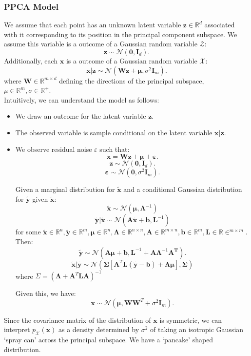 \subsubsection{PPCA Model}
We assume that each point has an unknown latent variable $\mathbf{z}\in
\mathbb{R}^{d}$ associated with it corresponding to its position in the
principal component subspace. We assume this variable is a outcome of a Gaussian random variable
$\mathcal{Z}$:
\[\mathbf{z}\sim\mathcal{N}\left( \mathbf{0},\mathbf{I}_d \right).\] 
Additionally, each $\mathbf{x}$ is a outcome of a Gaussian random variable $\mathcal{X}$:
\[\mathbf{x|z}\sim\mathcal{N}\left( \mathbf{Wz+\mu},\sigma^{2}\mathbf{I}_m \right).\]
where $\mathbf{W}\in \mathbb{R}^{m\times d}$ defining the directions of the
principal subspace, $\mu\in \mathbb{R}^{m},\sigma\in \mathbb{R}^{+}$.\\

Intuitively, we can understand the model as follows:
\begin{itemize}
  \item We draw an outcome for the latent variable $\mathbf{z}$.
  \item The observed variable is sample conditional on the latent variable $\mathbf{x}|\mathbf{z}$.
  \item We observe residual noise $\varepsilon$ such that:
    \[\mathbf{x}=\mathbf{Wz+\mu+\varepsilon}.\] 
    \[\mathbf{z}\sim\mathcal{N}\left( \mathbf{0},\mathbf{I}_d \right).\] 
    \[\mathbf{\varepsilon}\sim\mathcal{N}\left( \mathbf{0},\sigma^{2}\mathbf{I}_m \right).\] 
    \begin{remark}
      Given a marginal distribution for $\mathbf{\tilde{x}}$ and a conditional
      Gaussian distribution for $\mathbf{\tilde{y}}$ given
      $\mathbf{\tilde{x}}$:
      \[\mathbf{\tilde{x}}\sim\mathcal{N}(\mathbf{\mu},\mathbf{\Lambda}^{-1})\] 
      \[\mathbf{\tilde{y}|\tilde{x}}\sim\mathcal{N}(\mathbf{A\tilde{x}+b},\mathbf{L}^{-1})\] 
      for some $\mathbf{\tilde{x}}\in \mathbb{R}^{n},\mathbf{\tilde{y}}\in \mathbb{R}^{m},\mathbf{\mu}\in \mathbb{R}^{n},\mathbf{\Lambda}\in \mathbb{R}^{n\times n},\mathbf{A}\in \mathbb{R}^{m\times n},\mathbf{b}\in \mathbb{R}^{m},\mathbf{L}\in \mathbb{R}\in ^{m\times m}$. Then:
    \[\mathbf{\tilde{y}}\sim\mathcal{N}\left( \mathbf{A\mu+b,L}^{-1}+\mathbf{A\Lambda}^{-1}\mathbf{A^{T}} \right).\] 
      \[\mathbf{\tilde{x}|\tilde{y}}\sim\mathcal{N}(\mathbf{\Sigma} \left[ \mathbf{A}^{T}\mathbf{L(\tilde{y}-b)+\Lambda\mu} \right],\mathbf{\Sigma})\] 
      where $\Sigma={(\mathbf{\Lambda}+\mathbf{A}^{T}\mathbf{LA})}^{-1}$
    \end{remark}
    Given this, we have:
    \[\mathbf{x}\sim\mathcal{N}\left( \mathbf{\mu},\mathbf{WW}^{T}+\sigma^{2}\mathbf{I}_m \right).\] 
\end{itemize}
Since the covariance matrix of the distribution of $\mathbf{x}$ is symmetric,
we can interpret $p_\mathcal{X}(\mathbf{x})$ as a density determined by
$\sigma^{2}$ of taking an isotropic Gaussian `spray can' across the principal
subspace. We have a `pancake' shaped distribution.

